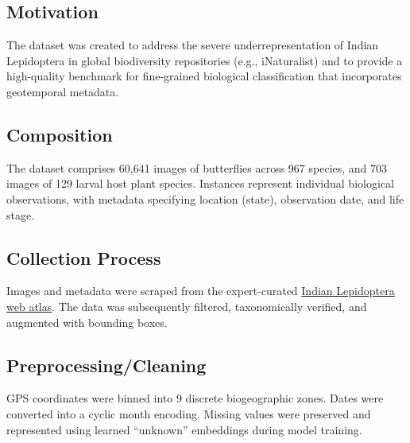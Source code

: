 \documentclass[runningheads]{llncs}
\begin{document}
\subsection{Motivation}
The dataset was created to address the severe underrepresentation of Indian Lepidoptera in global biodiversity repositories (e.g., iNaturalist) and to provide a high-quality benchmark for fine-grained biological classification that incorporates geotemporal metadata.
\subsection{Composition}
The dataset comprises 60,641 images of butterflies across 967 species, and 703 images of 129 larval host plant species. Instances represent individual biological observations, with metadata specifying location (state), observation date, and life stage.
\subsection{Collection Process}
Images and metadata were scraped from the expert-curated \href{https://www.ifoundbutterflies.org}{Indian Lepidoptera web atlas}. The data was subsequently filtered, taxonomically verified, and augmented with bounding boxes.
\subsection{Preprocessing/Cleaning}
GPS coordinates were binned into 9 discrete biogeographic zones. Dates were converted into a cyclic month encoding. Missing values were preserved and represented using learned ``unknown'' embeddings during model training.
\end{document}
